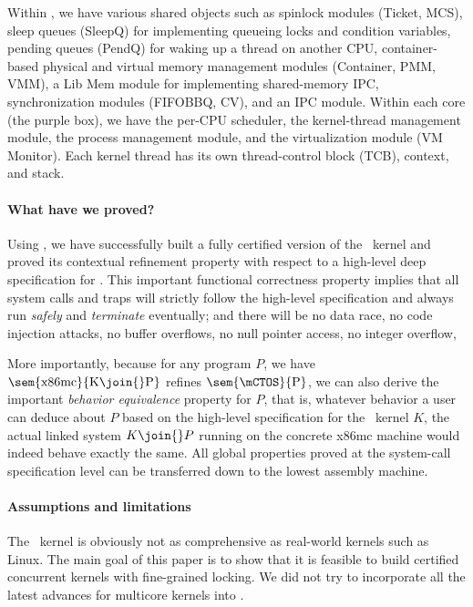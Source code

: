 Within \mCTOS, we have various shared objects such as spinlock modules
(Ticket, MCS), sleep queues (SleepQ) for implementing queueing locks
and condition variables, pending queues (PendQ) for waking up a
thread on another CPU, container-based physical and virtual memory
management modules (Container, PMM, VMM), a Lib Mem module for
implementing shared-memory IPC, synchronization modules (FIFOBBQ,
CV), and an IPC module. Within each core (the purple box), we have
the per-CPU scheduler, the kernel-thread management module, the process
management module, and the virtualization module (VM Monitor). Each
kernel thread has its own thread-control block (TCB), context, and stack.

\vspace*{-10pt}
\paragraph{What have we proved?}
Using \CTOS, we have successfully built a fully certified version of
the \mCTOS\ kernel and proved its contextual refinement property with
respect to a high-level deep specification for \mCTOS.  This important
functional correctness property implies that all system calls and
traps will strictly follow the high-level specification and always run
{\em safely} and {\em terminate} eventually; and there will be no data
race, no code injection attacks, no buffer overflows, no null pointer
access, no integer overflow, \etc

More importantly, because for any program $P$, we have 
$\sem{\rm{}x86mc}{K\join{}P}$ refines
$\sem{\rm\mCTOS}{P}$, we can also derive the
important {\em behavior equivalence} property for $P$, that is,
whatever behavior a user can deduce about $P$ based on the high-level
specification for the \mCTOS\ kernel $K$, the actual linked system
$K\join{}P$ running on the concrete x86mc machine would indeed behave
exactly the same.  All global properties proved at the system-call
specification level can be transferred down to the lowest assembly
machine.

\vspace*{-10pt}
\paragraph{Assumptions and limitations}
The \mCTOS\ kernel is obviously not as comprehensive as real-world
kernels such as Linux.  The main goal of this paper is to show that it
is feasible to build certified concurrent kernels with fine-grained
locking.  We did not try to incorporate all the latest advances for
multicore kernels into \mCTOS.


